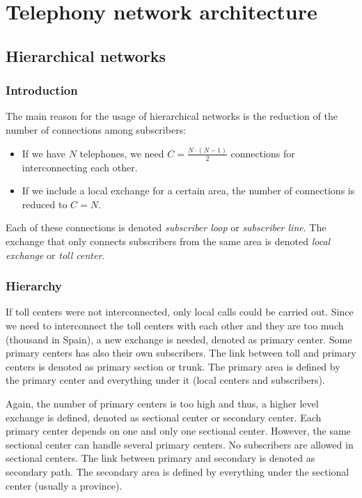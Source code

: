 \documentclass[../main.tex]{subfiles}
\begin{document}
\section{Telephony network architecture}

\subsection{Hierarchical networks}

\subsubsection{Introduction}

The main reason for the usage of hierarchical networks is the reduction of the number of connections among subscribers:

\begin{itemize}
	\item If we have $N$ telephones, we need $C = \frac {N \cdot (N - 1)} {2}$ connections for interconnecting each other.
	\item If we include a local exchange for a certain area, the number of connections is reduced to $C = N$.
\end{itemize}
Each of these connections is denoted \textit{subscriber loop} or \textit{subscriber line}. The exchange that only connects subscribers from the same area is denoted \textit{local exchange} or \textit{toll center}.

\subsubsection{Hierarchy}

If toll centers were not interconnected, only local calls could be carried out. Since we need to interconnect the toll centers with each other and they are too much (thousand in Spain), a new exchange is needed, denoted as primary center. Some primary centers has also their own subscribers. The link between toll and primary centers is denoted as primary section or trunk. The primary area is defined by the primary center and everything under it (local centers and subscribers).

Again, the number of primary centers is too high and thus, a higher level exchange is defined, denoted as sectional center or secondary center. Each primary center depends on one and only one sectional center. However, the same sectional center can handle several primary centers. No subscribers are allowed in sectional centers. The link between primary and secondary is denoted as secondary path. The secondary area is defined by everything under the sectional center (usually a province).
\end{document}
